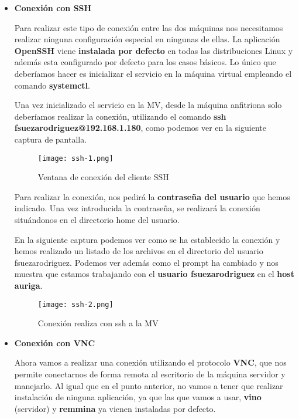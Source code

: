 \begin{itemize}
    \item \textbf{Conexión con SSH}

    Para realizar este tipo de conexión entre las dos máquinas nos necesitamos realizar ninguna configuración especial en ningunas de ellas. La aplicación \textbf{OpenSSH} viene \textbf{instalada por defecto} en todas las distribuciones Linux y además esta configurado por defecto para los casos básicos. Lo único que deberíamos hacer es inicializar el servicio en la máquina virtual empleando el comando \textbf{systemctl}.

    Una vez inicializado el servicio en la MV, desde la máquina anfitriona solo deberíamos realizar la conexión, utilizando el comando \textbf{ssh fsuezarodriguez@192.168.1.180}, como podemos ver en la siguiente captura de pantalla.

    \begin{figure}[H]
        \centering
        \texttt{[image: ssh-1.png]}
        \caption{Ventana de conexión del cliente SSH}
    \end{figure}

    Para realizar la conexión, nos pedirá la \textbf{contraseña del usuario} que hemos indicado. Una vez introducida la contraseña, se realizará la conexión situándonos en el directorio home del usuario.

    En la siguiente captura podemos ver como se ha establecido la conexión y hemos realizado un listado de los archivos en el directorio del usuario fsuezarodriguez. Podemos ver además como el prompt ha cambiado y nos muestra que estamos trabajando con el \textbf{usuario fsuezarodriguez} en el \textbf{host auriga}.

    \begin{figure}[H]
        \centering
        \texttt{[image: ssh-2.png]}
        \caption{Conexión realiza con ssh a la MV}
    \end{figure}

    \item \textbf{Conexión con VNC}

    Ahora vamos a realizar una conexión utilizando el protocolo \textbf{VNC}, que nos permite conectarnos de forma remota al escritorio de la máquina servidor y manejarlo. Al igual que en el punto anterior, no vamos a tener que realizar instalación de ninguna aplicación, ya que las que vamos a usar, \textbf{vino} (servidor) y \textbf{remmina} ya vienen instaladas por defecto.


\end{itemize}
